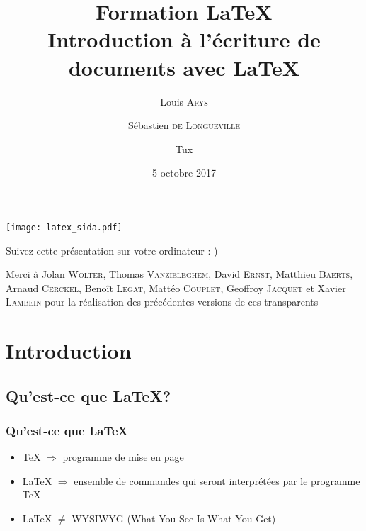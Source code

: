 \documentclass[10pt,svgnames,usenames,table]{beamer} %
\institute{Louvain-li-Nux}
\title{\textbf{Formation \LaTeX}\\
Introduction à l'écriture de documents avec \LaTeX}
\author{Louis \textsc{Arys} \and Sébastien \textsc{de Longueville} \and Tux}
\date{5 octobre 2017}
\begin{document}
\begin{landscape}
  \begin{frame}
    \vspace{-.5cm}
    \hspace*{.1mm}
    \texttt{[image: latex\_sida.pdf]}
  \end{frame}
\end{landscape}

\begin{frame}
  \begin{center}\Large
  Suivez cette présentation sur votre ordinateur :-)
  
  \vspace{1cm}
  \end{center}
\end{frame}


\begin{frame}
  \maketitle  
  Merci à Jolan \textsc{Wolter}, Thomas \textsc{Vanzieleghem}, David \textsc{Ernst}, Matthieu \textsc{Baerts}, Arnaud \textsc{Cerckel}, Benoît \textsc{Legat}, Mattéo \textsc{Couplet}, Geoffroy \textsc{Jacquet} et Xavier \textsc{Lambein} pour la réalisation des précédentes versions de ces transparents

\end{frame}


\section{Introduction}
\subsection{Qu'est-ce que \LaTeX{}?}
\begin{frame}
\frametitle{Qu'est-ce que \LaTeX}

\begin{itemize}
\item \TeX{} $ \Rightarrow$ programme de mise en page
\vspace{0.5cm}
\item \LaTeX{} $ \Rightarrow$ ensemble de commandes qui seront
 interprétées par le programme \TeX
 \vspace{0.5cm}
\item \LaTeX{} $ \neq$ WYSIWYG (What You See Is What You Get)
\end{itemize}

\end{frame}
\end{document}
